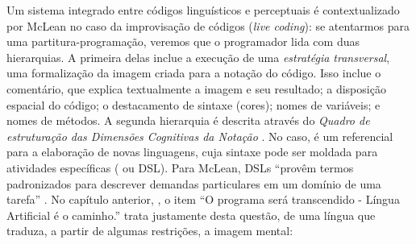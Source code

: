 Um sistema integrado entre códigos linguísticos e perceptuais é contextualizado por McLean no caso da improvisação de códigos (\emph{live coding}): se atentarmos para uma partitura-programação, veremos que o programador lida com duas hierarquias. A primeira delas inclue a execução de uma \emph{estratégia transversal}, uma formalização da imagem criada para a notação do código. Isso inclue o comentário, que explica textualmente a imagem e seu resultado; a disposição espacial do código; o destacamento de sintaxe (cores); nomes de variáveis; e nomes de métodos. A segunda hierarquia é descrita através do \emph{Quadro de estruturação das Dimensões Cognitivas da Notação} . No caso, é um referencial para a elaboração de novas linguagens, cuja sintaxe pode ser moldada para  atividades específicas ( ou DSL). Para McLean, DSLs ``provêm termos padronizados para descrever demandas particulares em um domínio de uma tarefa'' . No capítulo anterior, , o item ``O programa será transcendido - Língua Artificial é o caminho.'' trata justamente desta questão, de uma língua que traduza, a partir de algumas restrições, a imagem mental:


